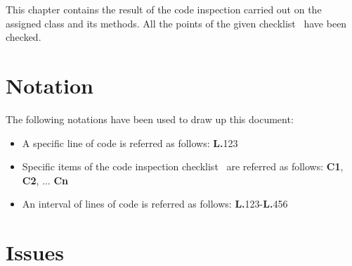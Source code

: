 This chapter contains the result of the code inspection carried out on the assigned class and its methods. All the points of the given checklist~\cite{assignment} have been checked.
\section{Notation}
The following notations have been used to draw up this document:
\begin{itemize}
\item A specific line of code is referred as follows: \textbf{L.}123
\item Specific items of the code inspection checklist~\cite{assignment} are referred as follows: \textbf{C1}, \textbf{C2}, ... \textbf{Cn}
\item An interval of lines of code is referred as follows: \textbf{L.}123-\textbf{L.}456
\end{itemize}

\section{Issues}
